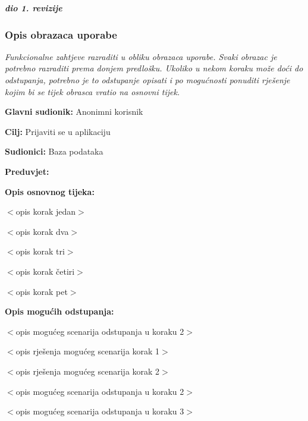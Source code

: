 \textbf{\textit{dio 1. revizije}}

\subsubsection{Opis obrazaca uporabe}
\textit{Funkcionalne zahtjeve razraditi u obliku obrazaca uporabe. Svaki obrazac je potrebno razraditi prema donjem predlošku. Ukoliko u nekom koraku može doći do odstupanja, potrebno je to odstupanje opisati i po mogućnosti ponuditi rješenje kojim bi se tijek obrasca vratio na osnovni tijek.}\\


\noindent {}
\begin{packed_item}

\item \textbf{Glavni sudionik:} Anonimni korisnik
\item  \textbf{Cilj:} Prijaviti se u aplikaciju
\item  \textbf{Sudionici:} Baza podataka
\item  \textbf{Preduvjet:} 
\item  \textbf{Opis osnovnog tijeka:}

\item[] \begin{packed_enum}

    \item $<$opis korak jedan$>$
    \item $<$opis korak dva$>$
    \item $<$opis korak tri$>$
    \item $<$opis korak četiri$>$
    \item $<$opis korak pet$>$

\end{packed_enum}

\item  \textbf{Opis mogućih odstupanja:}

\item[] \begin{packed_item}

    \item[2.a] $<$opis mogućeg scenarija odstupanja u koraku 2$>$

    \item[] \begin{packed_enum}

        \item $<$opis rješenja mogućeg scenarija korak 1$>$
        \item $<$opis rješenja mogućeg scenarija korak 2$>$

    \end{packed_enum}

\item[2.b] $<$opis mogućeg scenarija odstupanja u koraku 2$>$
\item[3.a] $<$opis mogućeg scenarija odstupanja  u koraku 3$>$

\end{packed_item}

\end{packed_item}

